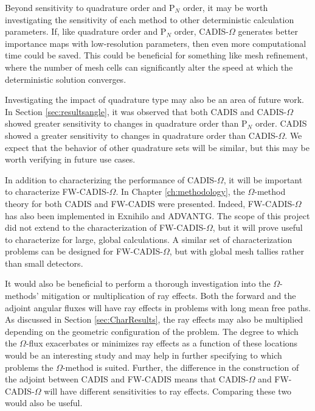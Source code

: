 Beyond sensitivity to quadrature order and P$_N$ order, it may be worth
investigating the sensitivity of each method to other deterministic calculation
parameters. If, like quadrature order and P$_N$ order, CADIS-$\Omega$ generates
better importance maps with low-resolution parameters, then even more
computational time could be saved. This could be beneficial for something like
mesh refinement, where the number of mesh cells can significantly alter the
speed at which the deterministic solution converges.

Investigating the impact of quadrature type may also be an area of future work.
In Section \ref{sec:resultsangle}, it was observed that both CADIS and
CADIS-$\Omega$ showed greater sensitivity to changes in quadrature order than
P$_N$ order. CADIS showed a greater sensitivity to changes in quadrature order
than CADIS-$\Omega$. We expect that the behavior of other quadrature sets will
be similar, but this may be worth verifying in future use cases.

In addition to characterizing the performance of CADIS-$\Omega$, it will be
important to characterize FW-CADIS-$\Omega$. In Chapter \ref{ch:methodology},
the $\Omega$-method theory for both CADIS and FW-CADIS were presented. Indeed,
FW-CADIS-$\Omega$ has also been implemented in Exnihilo and ADVANTG. The scope
of this project did not extend to the characterization of FW-CADIS-$\Omega$, but
it will prove useful to characterize for large, global calculations. A similar
set of characterization problems can be designed for FW-CADIS-$\Omega$, but with
global mesh tallies rather than small detectors.

It would also be beneficial to
perform a thorough investigation into the $\Omega$-methods' mitigation or
multiplication of ray effects. Both the forward and the adjoint angular fluxes
will have ray effects in problems with long mean free paths. As discussed in
Section \ref{sec:CharResults},
the ray effects may also be multiplied depending on the geometric
configuration of the problem. The degree to which the $\Omega$-flux exacerbates
or minimizes ray effects as a function of these locations would be an
interesting study and may help in further specifying to which problems the
$\Omega$-method is suited. Further, the difference in the construction of the
adjoint between CADIS and FW-CADIS means that CADIS-$\Omega$ and
FW-CADIS-$\Omega$ will have different sensitivities to ray effects. Comparing
these two would also be useful.

